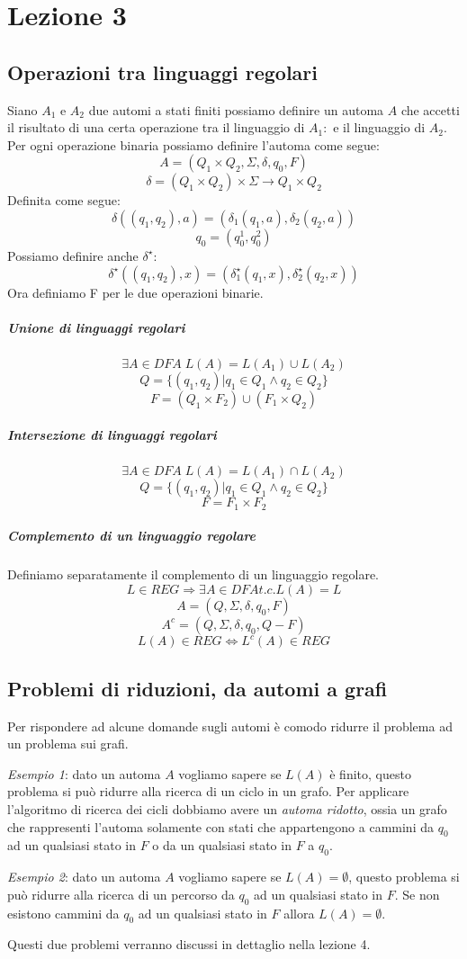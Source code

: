 
\section{Lezione 3}
\subsection{Operazioni tra linguaggi regolari}
Siano $A_1$ e $A_2$ due automi a stati finiti possiamo definire un automa $A$ che accetti il risultato di una certa operazione tra il linguaggio di $A_1:$ e il linguaggio di $A_2$.
Per ogni operazione binaria possiamo definire l'automa come segue:
\[
	A = (Q_1 \times Q_2, \Sigma, \delta, q_0, F)
\]
\[
	\delta = (Q_1 \times Q_2) \times \Sigma \to Q_1 \times Q_2
\]
Definita come segue:
\[
	\delta ((q_1, q_2), a) = (\delta_1 (q_1, a), \delta_2 (q_2, a) )
\]
\[
	q_0 = (q_0^1, q_0^2)
\]
Possiamo definire anche $\delta^{\star}$:
\[
	\delta^{\star} ( (q_1, q_2), x) = (\delta_1^{\star} (q_1, x), \delta_2^{\star} (q_2, x))
\]
Ora definiamo F per le due operazioni binarie.
\subparagraph{Unione di linguaggi regolari}
\[
	\exists A \in DFA \; L(A)=L(A_1) \cup L(A_2)
\]
\[
	Q = \{ (q_1, q_2) | q_1 \in Q_1 \land q_2 \in Q_2 \}
\]
\[
	F = (Q_1 \times F_2) \cup (F_1 \times Q_2)
\]
\subparagraph{Intersezione di linguaggi regolari} 
\[
	\exists A \in DFA \; L(A)=L(A_1) \cap L(A_2)
\]
\[
	Q = \{ (q_1, q_2) | q_1 \in Q_1 \land q_2 \in Q_2 \}
\]
\[
	F = F_1 \times F_2 
\]
\subparagraph{Complemento di un linguaggio regolare} Definiamo separatamente il complemento di un linguaggio regolare.
\[
	L \in REG \Rightarrow \exists A \in DFA t.c. L(A) = L
\] 
\[
	A = (Q, \Sigma, \delta, q_0, F)
\] 
\[
	A^c = (Q, \Sigma, \delta, q_0, Q-F)
\]
\[
	L(A) \in REG \Leftrightarrow L^c(A) \in REG
\]

\subsection{Problemi di riduzioni, da automi a grafi}
Per rispondere ad alcune domande sugli automi \`e comodo ridurre il problema ad un problema sui grafi.\newline
\begin{description}
	\item \emph{Esempio 1}: dato un automa $A$ vogliamo sapere se $L(A)$ \`e finito, questo problema si pu\`o ridurre alla ricerca di un ciclo in un grafo. Per applicare l'algoritmo di ricerca dei cicli dobbiamo avere un \emph{automa ridotto}, ossia un grafo che rappresenti l'automa solamente con stati che appartengono a cammini da $q_0$ ad un qualsiasi stato in $F$ o da un qualsiasi stato in $F$ a $q_0$. 

	\item \emph{Esempio 2}: dato un automa $A$ vogliamo sapere se $L(A)=\emptyset$, questo problema si pu\`o ridurre alla ricerca di un percorso da $q_0$ ad un qualsiasi stato in $F$. Se non esistono cammini da $q_0$ ad un qualsiasi stato in $F$ allora $L(A)=\emptyset$.
\end{description}
Questi due problemi verranno discussi in dettaglio nella lezione 4.

